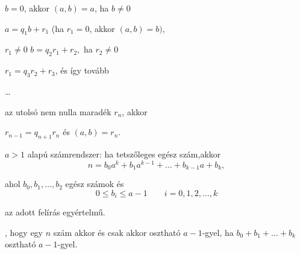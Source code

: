 \documentclass{article}
\begin{document}
 $b=0$, akkor $(a,b)=a$, ha $b\not=0$

$a=q_1b+r_1$ (ha $r_1=0$, akkor  $(a,b)=b),$

  $r_1\not=0$ $b=q_2r_1+r_2,$ ha $r_2\not=0$

$r_1=q_3r_2+r_3$, és így tovább

\ldots

 az utolsó nem nulla maradék $r_n$, akkor

$r_{n-1}=q_{n+1}r_n$ és $(a,b)=r_n$.

 $a>1$ alapú számrendszer: ha  tetszőleges egész szám,akkor 
$$n=b_0a^k+b_1a^{k-1}+\ldots +b_{k-1}a+b_k,$$

ahol $b_0,b_1,\ldots ,b_2$ egész számok és
$$0\leq b_i\leq a-1\qquad i=0,1,2, \ldots,k$$

az adott felírás egyértelmű.

, hogy egy $n$ szám akkor és csak akkor osztható $a-1$-gyel, ha $b_0+b_1+\ldots+b_k$ osztható $a-1$-gyel.
\end{document}
